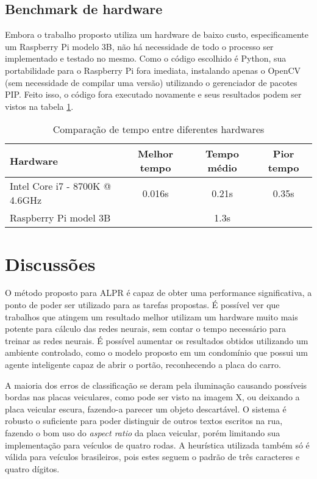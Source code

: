 \subsection{Benchmark de hardware}
\label{sub:timing}

Embora o trabalho proposto utiliza um hardware de baixo custo, especificamente um Raspberry Pi modelo 3B, não há necessidade de todo o processo ser implementado e testado no mesmo. Como o código escolhido é Python, sua portabilidade para o Raspberry Pi fora imediata, instalando apenas o OpenCV (sem necessidade de compilar uma versão) utilizando o gerenciador de pacotes PIP. Feito isso, o código fora executado novamente e seus resultados podem ser vistos na tabela \ref{tab:timing_hardware}.

\begin{table}[!htb]
\centering
\caption{Comparação de tempo entre diferentes hardwares}
\label{tab:timing_hardware}
\begin{tabular}{lccc}
Hardware & Melhor tempo & Tempo médio & Pior tempo \\ \hline
Intel Core i7 - 8700K @ 4.6GHz & 0.016s & 0.21s & 0.35s \\
Raspberry Pi model 3B &  & 1.3s & \\ \hline
\end{tabular}
\end{table}

\section{Discussões}
\label{sec:discussion}

O método proposto para ALPR é capaz de obter uma performance significativa, a ponto de poder ser utilizado para as tarefas propostas. É possível ver que trabalhos que atingem um resultado melhor \cite{laroca2018robust} utilizam um hardware muito mais potente para cálculo das redes neurais, sem contar o tempo necessário para treinar as redes neurais. É possível aumentar os resultados obtidos utilizando um ambiente controlado, como o modelo proposto em um condomínio que possui um agente inteligente capaz de abrir o portão, reconhecendo a placa do carro.

A maioria dos erros de classificação se deram pela iluminação causando possíveis bordas nas placas veiculares, como pode ser visto na imagem X, ou deixando a placa veicular escura, fazendo-a parecer um objeto descartável. O sistema é robusto o suficiente para poder distinguir de outros textos escritos na rua, fazendo o bom uso do \textit{aspect ratio} da placa veicular, porém limitando sua implementação para veículos de quatro rodas. A heurística utilizada também só é válida para veículos brasileiros, pois estes seguem o padrão de três caracteres e quatro dígitos.
